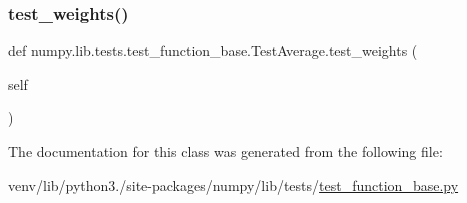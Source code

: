 \subsubsection{\texorpdfstring{test\+\_\+weights()}{test\_weights()}}
{\footnotesize\ttfamily def numpy.\+lib.\+tests.\+test\+\_\+function\+\_\+base.\+Test\+Average.\+test\+\_\+weights (\begin{DoxyParamCaption}\item[{}]{self }\end{DoxyParamCaption})}



The documentation for this class was generated from the following file\+:\begin{DoxyCompactItemize}
\item 
venv/lib/python3./site-\/packages/numpy/lib/tests/\hyperlink{lib_2tests_2test__function__base_8py}{test\+\_\+function\+\_\+base.\+py}\end{DoxyCompactItemize}
